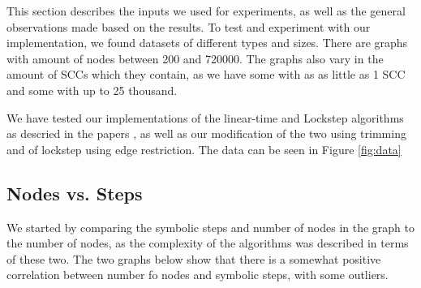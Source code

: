 \documentclass[../master/master.tex]{subfiles}
\begin{document}
This section describes the inputs we used for experiments, as well as the general observations made based on the results. To test and experiment with our implementation, we found datasets of different types and sizes. There are graphs with amount of nodes between 200 and 720000. The graphs also vary in the amount of SCCs which they contain, as we have some with as as little as 1 SCC and some with up to 25 thousand.

We have tested our implementations of the linear-time and Lockstep algorithms as descried in the papers \cite{linear}\cite{lockstep}, as well as our modification of the two using trimming and of lockstep using edge restriction. The data can be seen in Figure \ref{fig:data}

\subsection{Nodes vs. Steps}
We started by comparing the symbolic steps and number of nodes in the graph to the number of nodes, as the complexity of the algorithms was described in terms of these two. The two graphs below show that there is a somewhat positive correlation between number fo nodes and symbolic steps, with some outliers. 
\end{document}
